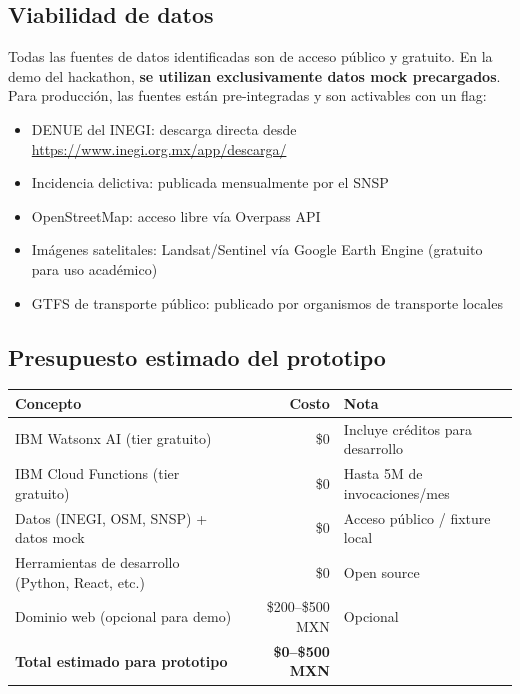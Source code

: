 \documentclass[12pt,a4paper]{article}
\begin{document}
\subsection{Viabilidad de datos}

Todas las fuentes de datos identificadas son de acceso público y gratuito. En la demo del hackathon, \textbf{se utilizan exclusivamente datos mock precargados}. Para producción, las fuentes están pre-integradas y son activables con un flag:

\begin{itemize}[leftmargin=1.5cm, itemsep=3pt]
  \item DENUE del INEGI: descarga directa desde \url{https://www.inegi.org.mx/app/descarga/}
  \item Incidencia delictiva: publicada mensualmente por el SNSP
  \item OpenStreetMap: acceso libre vía Overpass API
  \item Imágenes satelitales: Landsat/Sentinel vía Google Earth Engine (gratuito para uso académico)
  \item GTFS de transporte público: publicado por organismos de transporte locales
\end{itemize}

\subsection{Presupuesto estimado del prototipo}

\begin{table}[H]
\centering
\small
\renewcommand{\arraystretch}{1.3}
\begin{tabularx}{\textwidth}{X r l}
\toprule
\rowcolor{azuloscuro}
\color{white}\textbf{Concepto} & \color{white}\textbf{Costo} & \color{white}\textbf{Nota} \\
\midrule
IBM Watsonx AI (tier gratuito) & \$0 & Incluye créditos para desarrollo \\
\rowcolor{fondoazul}
IBM Cloud Functions (tier gratuito) & \$0 & Hasta 5M de invocaciones/mes \\
Datos (INEGI, OSM, SNSP) + datos mock & \$0 & Acceso público / fixture local \\
\rowcolor{fondoazul}
Herramientas de desarrollo (Python, React, etc.) & \$0 & Open source \\
Dominio web (opcional para demo) & \$200–\$500 MXN & Opcional \\
\midrule
\rowcolor{fondogris}
\textbf{Total estimado para prototipo} & \textbf{\$0–\$500 MXN} & \\
\bottomrule
\end{tabularx}
\end{table}
\end{document}
